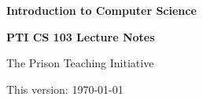 \begin{titlepage}
    \vspace*{5cm}
    
    \begin{fullwidth}
    {\noindent \Huge \bfseries{Introduction to Computer Science}}
    \end{fullwidth}

    \vspace{3cm}

    {\noindent \large \textbf{PTI CS 103 Lecture Notes}}

    \vspace{1.5cm}

    {\noindent \large The Prison Teaching Initiative}

    \vfill

    {\noindent \small This version: \today}
\end{titlepage}